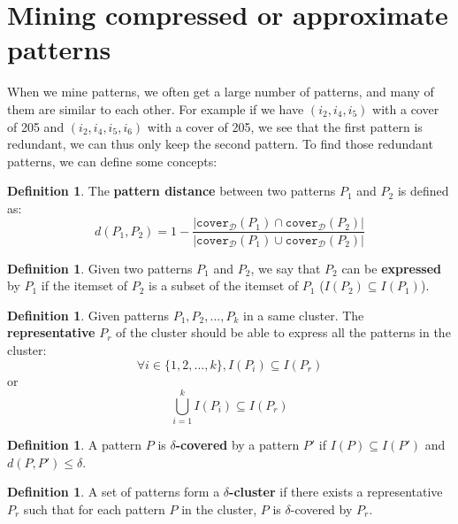 \documentclass[12pt, openany]{report}
\theoremstyle{definition}
\newtheorem{definition}[thm]{Definition}
\begin{document}
\section{Mining compressed or approximate patterns}
When we mine patterns, we often get a large number of patterns, and many of them are similar to each other. For example if we have $(i_2,i_4,i_5)$ with a cover of 205 and $(i_2,i_4,i_5, i_6)$ with a cover of 205, we see that the first pattern is redundant, we can thus only keep the second pattern. To find those redundant patterns, we can define some concepts:
\begin{definition}
    The \textbf{pattern distance} between two patterns $P_1$ and $P_2$ is defined as:
    \begin{equation}
    d(P_1, P_2) = 1 - \frac{|\texttt{cover}_{\mathcal{D}}(P_1) \cap \texttt{cover}_{\mathcal{D}}(P_2)|}{|\texttt{cover}_{\mathcal{D}}(P_1) \cup \texttt{cover}_{\mathcal{D}}(P_2)|}
    \end{equation}
\end{definition}
\begin{definition}
    Given two patterns $P_1$ and $P_2$, we say that $P_2$ can be \textbf{expressed} by $P_1$ if the itemset of $P_2$ is a subset of the itemset of $P_1$ ($I(P_2) \subseteq I(P_1)$).
\end{definition}
\begin{definition}
    Given patterns $P_1, P_2, \dots, P_k$ in a same cluster. The \textbf{representative} $P_r$ of the cluster should be able to express all the patterns in the cluster:
    \begin{equation}
        \forall i \in \{1, 2, \dots, k\}, I(P_i) \subseteq I(P_r)
    \end{equation}
    or 
    \begin{equation}
        \bigcup_{i=1}^{k} I(P_i) \subseteq I(P_r)
    \end{equation}
\end{definition}
\begin{definition}
    A pattern $P$ is \textbf{$\delta$-covered} by a pattern $P'$ if $I(P) \subseteq I(P')$ and $d(P, P') \leq \delta$. 
\end{definition}
\begin{definition}
    A set of patterns form a \textbf{$\delta$-cluster} if there exists a representative $P_r$ such that for each pattern $P$ in the cluster, $P$ is $\delta$-covered by $P_r$. 
\end{definition}
\end{document}
